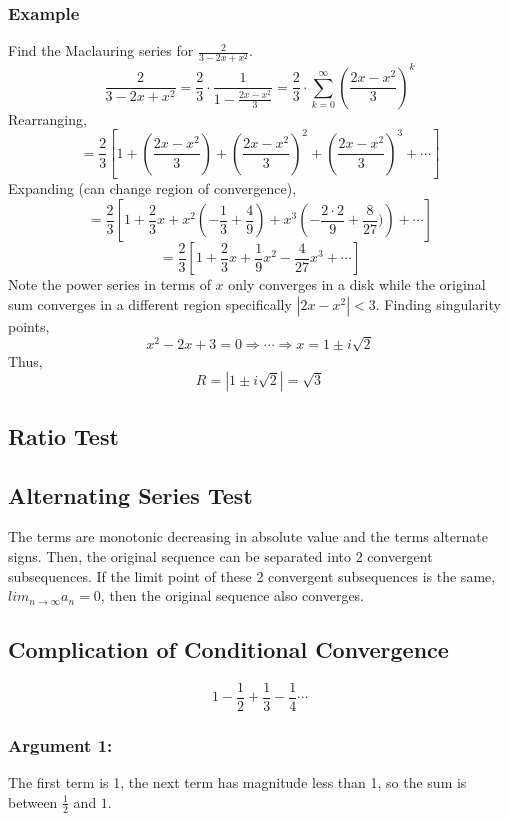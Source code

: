 \documentclass[../main.tex]{subfiles}
\begin{document}
        \subsubsection{Example}
            Find the Maclauring series for $\frac{2}{3-2x+x^{2}}$.
            $$\frac{2}{3-2x+x^{2}}=\frac{2}{3}\cdot\frac{1}{1-\frac{2x-x^{2}}{3}}=\frac{2}{3}\cdot\sum_{k=0}^{\infty}\left(\frac{2x-x^{2}}{3}\right)^{k}$$
            Rearranging,
            $$=\frac{2}{3}\left[1+\left(\frac{2x-x^{2}}{3}\right)+\left(\frac{2x-x^{2}}{3}\right)^{2}+\left(\frac{2x-x^{2}}{3}\right)^{3}+\cdots\right]$$
            Expanding (can change region of convergence),
            $$=\frac{2}{3}\left[1+\frac{2}{3}x+x^{2}\left(-\frac{1}{3}+\frac{4}{9}\right)+x^{3}\left(-\frac{2\cdot2}{9}+\frac{8}{27})\right)+\cdots\right]$$
            $$=\frac{2}{3}\left[1+\frac{2}{3}x+\frac{1}{9}x^{2}-\frac{4}{27}x^{3}+\cdots\right]$$
            Note the power series in terms of $x$ only converges in a disk while the original sum converges in a different region specifically $|2x-x^{2}|<3$.
            Finding singularity points,
            $$x^{2}-2x+3=0\Rightarrow\cdots\Rightarrow x=1\pm i\sqrt{2}$$
            Thus,
            $$R=|1\pm i\sqrt{2}|=\sqrt{3}$$

    \subsection{Ratio Test}

    \subsection{Alternating Series Test}
        The terms are monotonic decreasing in absolute value and the terms alternate signs. Then,
        the original sequence can be separated into 2 convergent subsequences. If the limit point of 
        these 2 convergent subsequences is the same, $lim_{n\rightarrow\infty}a_{n}=0$, then the 
        original sequence also converges.

    \subsection{Complication of Conditional Convergence}
        $$1-\frac{1}{2}+\frac{1}{3}-\frac{1}{4}\cdots$$
        \subsubsection{Argument 1: }
            The first term is 1, the next term has magnitude less than 1, so the sum is between
            $\frac{1}{2}$ and $1$.
\end{document}
